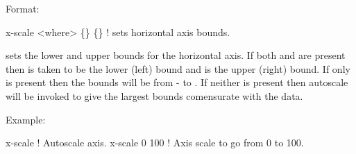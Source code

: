 Format:
\begin{example}
  x-scale <where> \{<bound1>\} \{<bound2>\}  ! sets horizontal axis bounds.
\end{example}

\vskip 0.2in 
 sets the lower and upper bounds for the horizontal axis.
If both  and  are present then 
is taken to be the lower (left) bound and  is the upper
(right) bound. If only  is present then the bounds will
be from - to . If neither is present then
autoscale will be invoked to give the largest bounds comensurate with
the data.

Example:
\begin{example}
  x-scale        ! Autoscale axis.
  x-scale 0 100  ! Axis scale to go from 0 to 100.
\end{example}


